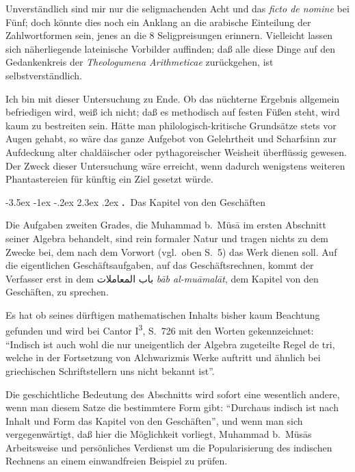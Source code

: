 \documentclass[11pt,a4paper]{article}
\makeatletter
\newcommand{\RL}[1]{\beginR#1\endR}
\renewcommand{\section}{\@startsection{section}{1}{\z@}%
  {-3.5ex \@plus -1ex \@minus -.2ex}%
  {2.3ex \@plus .2ex}%
  {\normalfont\Large\bfseries\color{sectioncolor}\thesection.\ }}
\newcommand{\ar}[1]{{\arabicfont\RL{#1}}}
\newcommand{\enquote}[1]{``#1''}
\makeatother
\begin{document}
Unverst\"andlich sind mir nur die seligmachenden Acht und das \textit{ficto de nomine} bei F\"unf; doch k\"onnte dies noch ein Anklang an die arabische Einteilung der Zahlwortformen sein, jenes an die 8 Seligpreisungen erinnern. Vielleicht lassen sich n\"aherliegende lateinische Vorbilder auffinden; da\ss{} alle diese Dinge auf den Gedankenkreis der \textit{Theologumena Arithmeticae} zur\"uckgehen, ist selbstverst\"andlich.

Ich bin mit dieser Untersuchung zu Ende. Ob das n\"uchterne Ergebnis allgemein befriedigen wird, wei\ss{} ich nicht; da\ss{} es methodisch auf festen F\"u\ss{}en steht, wird kaum zu bestreiten sein. H\"atte man philologisch-kritische Grunds\"atze stets vor Augen gehabt, so w\"are das ganze Aufgebot von Gelehrtheit und Scharfsinn zur Aufdeckung alter chald\"aischer oder pythagoreischer Weisheit \"uberfl\"ussig gewesen. Der Zweck dieser Untersuchung w\"are erreicht, wenn dadurch wenigstens weiteren Phantastereien f\"ur k\"unftig ein Ziel gesetzt w\"urde.

\clearpage

\section{Das Kapitel von den Gesch\"aften}

Die Aufgaben zweiten Grades, die Muhammad b.\ M\"us\=a im ersten Abschnitt seiner Algebra behandelt, sind rein formaler Natur und tragen nichts zu dem Zwecke bei, dem nach dem Vorwort (vgl.\ oben S.\ 5) das Werk dienen soll. Auf die eigentlichen Gesch\"aftsaufgaben, auf das Gesch\"aftsrechnen, kommt der Verfasser erst in dem \ar{باب المعاملات} \textit{b\=ab al-mu\=amal\=at}, dem Kapitel von den Gesch\"aften, zu sprechen.

Es hat ob seines d\"urftigen mathematischen Inhalts bisher kaum Beachtung gefunden und wird bei Cantor I\textsuperscript{3}, S.\ 726 mit den Worten gekennzeichnet: \enquote{Indisch ist auch wohl die nur uneigentlich der Algebra zugeteilte Regel de tri, welche in der Fortsetzung von Alchwarizmis Werke auftritt und \"ahnlich bei griechischen Schriftstellern uns nicht bekannt ist}.

Die geschichtliche Bedeutung des Abschnitts wird sofort eine wesentlich andere, wenn man diesem Satze die bestimmtere Form gibt: \enquote{Durchaus indisch ist nach Inhalt und Form das Kapitel von den Gesch\"aften}, und wenn man sich vergegenw\"artigt, da\ss{} hier die M\"oglichkeit vorliegt, Muhammad b.\ M\"us\=as Arbeitsweise und pers\"onliches Verdienst um die Popularisierung des indischen Rechnens an einem einwandfreien Beispiel zu pr\"ufen.
\end{document}
